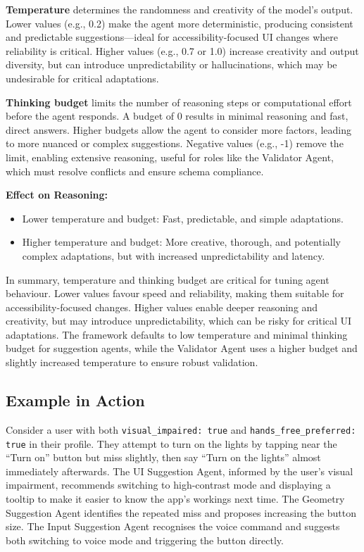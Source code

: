 \textbf{Temperature} determines the randomness and creativity of the model’s output. Lower values (e.g., 0.2) make the agent more deterministic, producing consistent and predictable suggestions—ideal for accessibility-focused UI changes where reliability is critical. Higher values (e.g., 0.7 or 1.0) increase creativity and output diversity, but can introduce unpredictability or hallucinations, which may be undesirable for critical adaptations.

\textbf{Thinking budget} limits the number of reasoning steps or computational effort before the agent responds. A budget of 0 results in minimal reasoning and fast, direct answers. Higher budgets allow the agent to consider more factors, leading to more nuanced or complex suggestions. Negative values (e.g., -1) remove the limit, enabling extensive reasoning, useful for roles like the Validator Agent, which must resolve conflicts and ensure schema compliance.

\textbf{Effect on Reasoning:}
\begin{itemize}
    \item Lower temperature and budget: Fast, predictable, and simple adaptations.
    \item Higher temperature and budget: More creative, thorough, and potentially complex adaptations, but with increased unpredictability and latency.
\end{itemize}

In summary, temperature and thinking budget are critical for tuning agent behaviour. Lower values favour speed and reliability, making them suitable for accessibility-focused changes. Higher values enable deeper reasoning and creativity, but may introduce unpredictability, which can be risky for critical UI adaptations. The framework defaults to low temperature and minimal thinking budget for suggestion agents, while the Validator Agent uses a higher budget and slightly increased temperature to ensure robust validation.

\subsection{Example in Action}
Consider a user with both \texttt{visual\_impaired: true} and \texttt{hands\_free\_preferred: true} in their profile. They attempt to turn on the lights by tapping near the “Turn on” button but miss slightly, then say “Turn on the lights” almost immediately afterwards. The UI Suggestion Agent, informed by the user’s visual impairment, recommends switching to high-contrast mode and displaying a tooltip to make it easier to know the app's workings next time. The Geometry Suggestion Agent identifies the repeated miss and proposes increasing the button size. The Input Suggestion Agent recognises the voice command and suggests both switching to voice mode and triggering the button directly.

